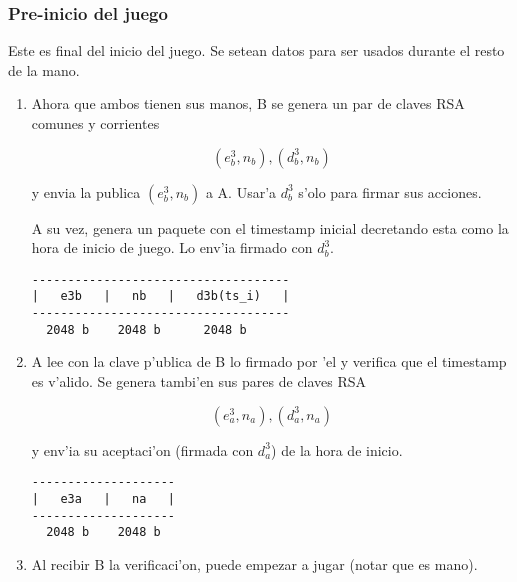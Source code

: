 \subsubsection{Pre-inicio del juego}
Este es final del inicio del juego. Se setean datos para ser usados durante el resto de la mano.

\begin{enumerate}
\item Ahora que ambos tienen sus manos, B se genera un par de claves RSA comunes y corrientes 

$$	(e^3_b, n_b), (d^3_b, n_b)  $$
	
y envia la publica $(e^3_b, n_b)$ a A. Usar'a $d^3_b$ s'olo para firmar sus acciones.

A su vez, genera un paquete con el timestamp inicial decretando esta como la hora de inicio de juego. Lo env'ia firmado con $d^3_b$.

\begin{verbatim}
------------------------------------
|   e3b   |   nb   |   d3b(ts_i)   |
------------------------------------
  2048 b    2048 b      2048 b
\end{verbatim}
  
  
  


\item A lee con la clave p'ublica de B lo firmado por 'el y verifica que el timestamp es v'alido. Se genera tambi'en sus pares de claves RSA

$$	(e^3_a, n_a), (d^3_a, n_a) $$
	
y env'ia su aceptaci'on (firmada con $d^3_a$) de la hora de inicio.


\begin{verbatim}
--------------------
|   e3a   |   na   |
--------------------
  2048 b    2048 b  
\end{verbatim}
  
  


\item Al recibir B la verificaci'on, puede empezar a jugar (notar que es mano).

\end{enumerate}
